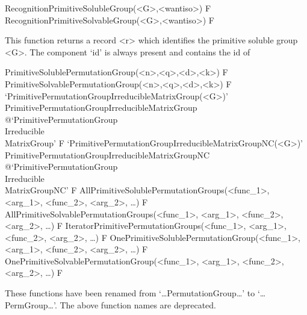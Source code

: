 \>RecognitionPrimitiveSolubleGroup(<G>,<wantiso>) F
\>RecognitionPrimitiveSolvableGroup(<G>,<wantiso>) F

This function returns a record <r> which identifies the primitive soluble group <G>.
The component `id' is always present and contains the id of

\>PrimitiveSolublePermutationGroup(<n>,<q>,<d>,<k>) F
\>PrimitiveSolvablePermutationGroup(<n>,<q>,<d>,<k>) F
\>`PrimitivePermutationGroupIrreducibleMatrixGroup(<G>)'%
{PrimitivePermutationGroupIrreducibleMatrixGroup}%
@{`PrimitivePermutationGroup\\Irreducible\\MatrixGroup'} F
\>`PrimitivePermutationGroupIrreducibleMatrixGroupNC(<G>)'%
{PrimitivePermutationGroupIrreducibleMatrixGroupNC}%
@{`PrimitivePermutationGroup\\Irreducible\\MatrixGroupNC'} F
\>AllPrimitiveSolublePermutationGroups(<func_1>, <arg_1>, <func_2>, <arg_2>, \dots) F
\>AllPrimitiveSolvablePermutationGroups(<func_1>, <arg_1>, <func_2>, <arg_2>, \dots) F
\>IteratorPrimitivePermutationGroups(<func_1>, <arg_1>, <func_2>, <arg_2>, \dots) F
\>OnePrimitiveSolublePermutationGroup(<func_1>, <arg_1>, <func_2>, <arg_2>, \dots) F
\>OnePrimitiveSolvablePermutationGroup(<func_1>, <arg_1>, <func_2>, <arg_2>, \dots) F

These functions have been renamed from `\dots PermutationGroup\dots' to `\dots PermGroup\dots'.
The above function names are deprecated.


